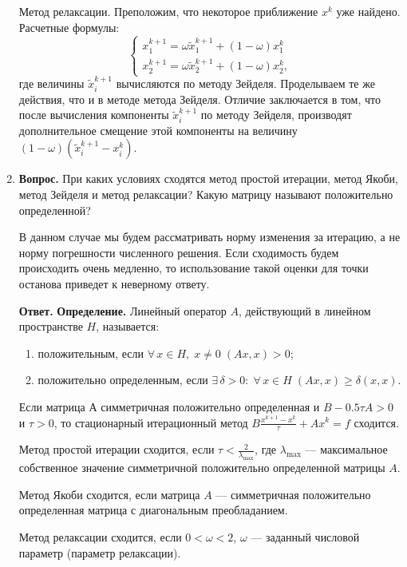\documentclass[12pt, a4paper]{article}
\begin{document}
\begin{enumerate}
	Метод релаксации.  Преположим, что некоторое приближение $x^k$ уже найдено.
	Расчетные формулы: 
	\[
	\begin{cases}
		x_1^{k+1} = \omega \tilde{x}_1^{k+1} + (1-\omega)x_1^k\\
		x_2^{k+1} =  \omega \tilde{x}_2^{k+1} + (1-\omega)x_2^k,
	\end{cases} 
	\]
	где величины $\tilde{x}_i^{k+1}$ вычисляются по методу Зейделя. Проделываем те же действия, что и в методе метода Зейделя. Отличие заключается в том, что после вычисления компоненты $\tilde{x}_i^{k+1}$ по методу Зейделя, производят
	дополнительное смещение этой компоненты на величину $(1-\omega)(\tilde{x}_i^{k+1}-x_i^{k})$.
	
	\item  \textbf{Вопрос.} При каких условиях сходятся метод простой итерации, метод Якоби, метод Зейделя и метод релаксации? Какую матрицу называют положительно определенной?
	
	В данном случае мы будем рассматривать норму изменения за итерацию, а не норму погрешности численного решения. Если сходимость будем происходить очень медленно, то использование такой оценки для точки останова приведет к неверному ответу.
	
	\textbf{Ответ.}
	 \textbf{Определение.} Линейный оператор $ A $, действующий в линейном пространстве $ H $, называется:
	\begin{enumerate}
		\item положительным, если $ \forall \, x \in H, \; x \ne 0 \; (Ax,x) > 0; $
		\item положительно определенным, если $ \exists \, \delta > 0: \; \forall \, x \in H \; (Ax,x) \geq \delta (x,x)$.
	\end{enumerate}
\medskip

Если матрица $ А $ симметричная положительно определенная и $ B - 0.5\tau A > 0$ и $\tau > 0 $, то стационарный итерационный метод $ B \frac{x^{k + 1} - x^k}{\tau}+A x^k = f $ сходится.

Метод простой итерации сходится, если $ \tau < \frac{2}{\lambda_{\text{max}}} $, где $\lambda_{\text{max}}$ --- максимальное собственное значение симметричной положительно определенной матрицы $A$.

 Метод Якоби сходится, если матрица $A$ --- симметричная положительно определенная матрица с диагональным преобладанием.
 
 Метод релаксации сходится, если $ 0 < \omega < 2 $, $\omega$ --- заданный числовой параметр (параметр релаксации).
 

\end{enumerate}
\end{document}
